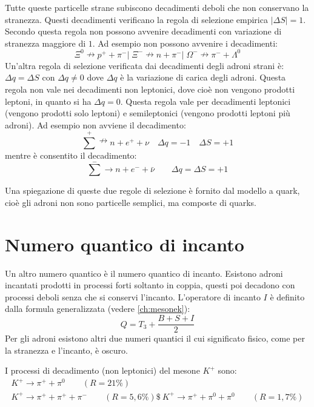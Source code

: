 Tutte queste particelle strane subiscono decadimenti deboli che non conservano la stranezza.
Questi decadimenti verificano la regola di selezione empirica $|\Delta S|=1$. Secondo questa regola non
possono avvenire decadimenti con variazione di stranezza maggiore di $1$.
Ad esempio non possono avvenire i decadimenti:
\begin{equation}
\Xi^0\nrightarrow p^++\pi^-|\;\Xi^-\nrightarrow n+\pi^-|\;\Omega^-\nrightarrow \pi^-+\Lambda^0
\end{equation}
Un'altra regola di selezione verificata dai decadimenti degli adroni strani è:
$\Delta q= \Delta S$ con $\Delta q\neq 0$ dove $\Delta q$ è la variazione di carica
degli adroni. Questa regola non vale nei decadimenti non leptonici, dove cioè non vengono prodotti leptoni, in
quanto si ha $\Delta q=0$. Questa regola vale per decadimenti leptonici (vengono prodotti solo leptoni) e
semileptonici (vengono prodotti leptoni più adroni). Ad esempio non avviene il decadimento:
\begin{equation}
\sum^+ \nrightarrow n+e^+ +\nu\quad \Delta q=-1\quad \Delta S=+1
\end{equation}
mentre è consentito il decadimento:
\begin{equation}
\sum^-\rightarrow n+e^-+\bar{\nu}\qquad \Delta q=\Delta S=+1
\end{equation}

Una spiegazione di queste due regole di selezione è fornito dal modello a quark, cioè gli adroni non sono
particelle semplici, ma composte di quarks.

\section{Numero quantico di incanto}
Un altro numero quantico è il numero quantico di incanto.
Esistono adroni incantati prodotti in processi forti soltanto in coppia,
questi poi decadono con processi deboli senza che si conservi l'incanto.
L'operatore di incanto $I$ è definito dalla formula generalizzata (vedere
\autoref{ch:mesonek}):
\begin{equation}
Q=T_3+\frac{B+S+I}{2}
\end{equation}
Per gli adroni esistono altri due numeri quantici il cui significato fisico, come per la stranezza e l'incanto, è oscuro.

 I processi di decadimento (non leptonici) del mesone $K^+$ sono:
\begin{gather}
K^+\rightarrow \pi^++\pi^0\qquad (R=21\%)\\
K^+\rightarrow \pi^++\pi^++\pi^-\qquad(R=5,6\%)\$\
K^+\rightarrow \pi^++\pi^0+\pi^0\qquad (R=1,7\%)
\end{gather}

